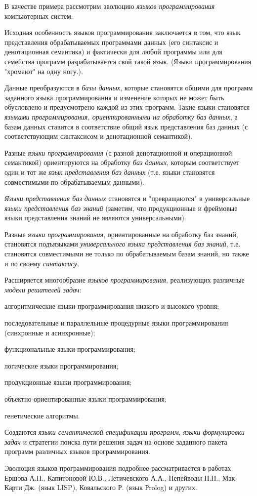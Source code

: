 В качестве примера рассмотрим эволюцию \textit{языков программирования} компьютерных систем:
\begin{textitemize}
	\item Исходная особенность языков программирования заключается в том, что язык представления обрабатываемых программами данных (его синтаксис и денотационная семантика)  и фактически для любой программы или для семейства программ разрабатывается свой такой язык. (Языки программирования "хромают"{} на одну ногу.).
	\item Данные преобразуются в \textit{базы данных}, которые становятся общими для программ заданного языка программирования и изменение которых не может быть обусловлено и предусмотрено каждой из этих программ. Такие языки  становятся \textit{языками программирования, ориентированными на обработку баз данных}, а базам данных ставится в соответствие общий язык представления баз данных (с соответствующим синтаксисом и денотационной семантикой).
	\item Разные \textit{языки программирования} (с разной денотационной и операционной семантикой) ориентируются на обработку \textit{баз данных}, которым соответствует один и тот же \textit{язык представления баз данных} (т.е. языки становятся совместимыми по обрабатываемым данными).
	\item \textit{Языки представления баз данных} становятся  и "превращаются"{} в универсальные \textit{языки представления баз знаний} (заметим, что продукционные и фреймовые языки представления знаний не являются универсальными).
	\item Разные \textit{языки программирования}, ориентированные на обработку баз знаний, становятся подъязыками \textit{универсального языка представления  баз знаний}, т.е. становятся совместимыми не только по обрабатываемым базам знаний, но также и по своему \textit{синтаксису}.
	\item Расширяется многообразие \textit{языков программирования}, реализующих различные \textit{модели решателей задач}:
	\begin{textitemize}
		\item алгоритмические языки программирования низкого и высокого уровня;
		\item последовательные и параллельные процедурные языки программирования (синхронные и асинхронные);
		\item функциональные языки программирования;
		\item логические языки программирования;
		\item продукционные языки программирования;
		\item объектно-ориентированные языки программирования;
		\item генетические алгоритмы.
	\end{textitemize}
	\item Создаются \textit{языки семантической спецификации программ}, \textit{языки формулировки задач} и стратегии поиска пути решения задач на основе заданного пакета программ различных языков программирования.
\end{textitemize}

Эволюция языков программирования подробнее рассматривается в работах Ершова А.П., Капитоновой Ю.В., Летичевского А.А., Непейводы Н.Н., Мак-Карти Дж. (язык LISP), Ковальского Р. (язык Рrolog) и других.

% 